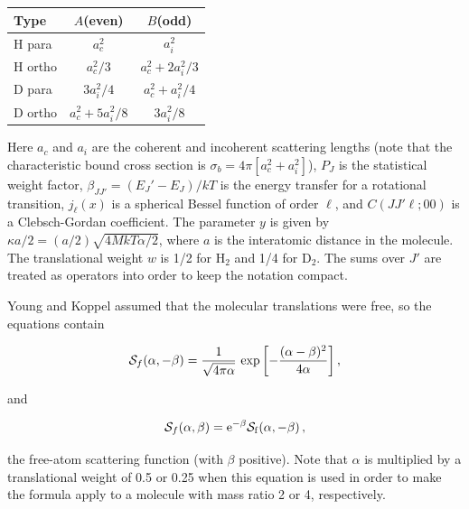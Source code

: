 \begin{center}
\begin{tabular}{lcc}
Type  &  $A$(even)  &  $B$(odd) \\ \hline
H para  &  $a_c^2$  &  $a_i^2$ \\
H ortho  &  $a_c^2/3$  & $a_c^2+2a_i^2/3$ \\
D para  & $3a_i^2/4$  &  $a_c^2+a_i^2/4$ \\
D ortho  &  $a_c^2+5a_i^2/8$  &  $3a_i^2/8$ \\ \hline
\end{tabular}
\end{center}

\noindent
Here $a_c$ and $a_i$ are the coherent and incoherent scattering lengths
(note that the characteristic bound cross section is
$\sigma_b{=}4\pi[a_c^2{+}a_i^2]$), $P_J$ is the statistical weight
factor, $\beta_{JJ'}{=}(E_J'{-}E_J)/kT$ is the energy transfer for a
rotational transition, $j_\ell(x)$ is a spherical Bessel function of
order $\ell$, and $C(JJ'\ell;00)$ is a Clebsch-Gordan coefficient.
The parameter $y$ is given by $\kappa a/2{=}(a/2)\sqrt{4MkT\alpha/2}$,
where $a$ is the interatomic distance in the molecule. The translational
weight $w$ is 1/2 for H$_2$ and 1/4 for D$_2$.  The sums over $J'$ are
treated as operators into order to keep the notation compact.

Young and Koppel assumed that the molecular translations were
free,
so the equations contain

\begin{equation}
   {\cal S}_f(\alpha,-\beta)=\frac{1}{\sqrt{4\pi\alpha}}
       \,\exp\left[-\frac{(\alpha-\beta)^2}{4\alpha}\right],
\end{equation}

\noindent
and

\begin{equation}
   {\cal S}_f(\alpha,\beta)=\rm e^{-\beta}{\cal S}_f(\alpha,-\beta)\,,
\end{equation}

\noindent
the free-atom scattering function (with $\beta$ positive).  Note that
$\alpha$ is multiplied by a translational weight of 0.5 or 0.25 when
this equation is used in order to make the formula apply to a molecule
with mass ratio 2 or 4, respectively.

